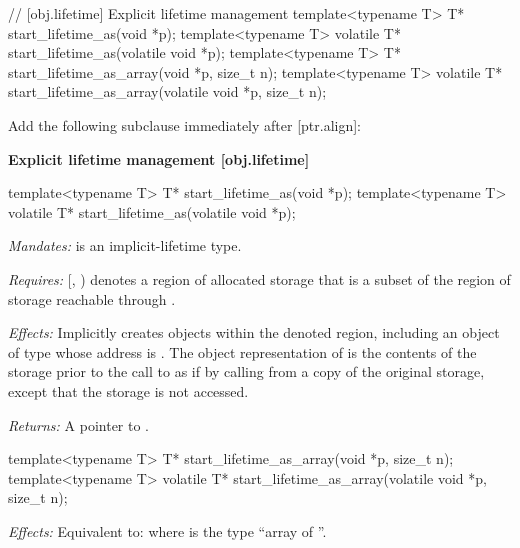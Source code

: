 \begin{adjustwidth}{0.5cm}{0.5cm}

\begin{addedblock}
\begin{codeblock}
// [obj.lifetime] Explicit lifetime management
template<typename T> T* start_lifetime_as(void *p);
template<typename T> volatile T* start_lifetime_as(volatile void *p);
template<typename T> T* start_lifetime_as_array(void *p, size_t n);
template<typename T> volatile T* start_lifetime_as_array(volatile void *p, size_t n);
\end{codeblock}
\end{addedblock}
\end{adjustwidth}

Add the following subclause immediately after [ptr.align]:

\begin{addedblock}
\textbf{Explicit lifetime management \hspace{83mm}[obj.lifetime]}

\begin{codeblock}
template<typename T> T* start_lifetime_as(void *p);
template<typename T> volatile T* start_lifetime_as(volatile void *p);
\end{codeblock}

\begin{adjustwidth}{0.5cm}{0.5cm}
\emph{Mandates:}  is an implicit-lifetime type.

\emph{Requires:} [, ) denotes a region of allocated storage that is a subset of the region of storage reachable through .

\emph{Effects:} Implicitly creates objects within the denoted region,
including an object  of type  whose address is . The object
representation of  is the contents of the storage prior to the
call to  as if by calling  from a copy of the
original storage, except that the storage is not accessed.

\emph{Returns:} A pointer to .
\end{adjustwidth}

\begin{codeblock}
template<typename T> T* start_lifetime_as_array(void *p, size_t n);
template<typename T> volatile T* start_lifetime_as_array(volatile void *p, size_t n);
\end{codeblock}

\begin{adjustwidth}{0.5cm}{0.5cm}
\emph{Effects:} Equivalent to:  where  is the type ``array of  ''.
\end{adjustwidth}

\end{addedblock}

